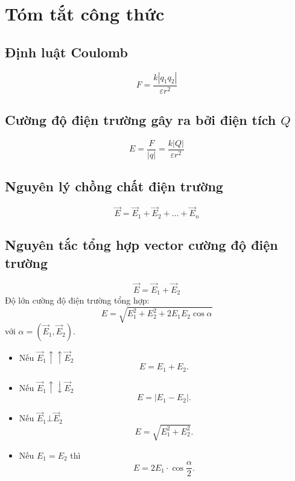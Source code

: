 \chapter{Tóm tắt công thức}
\begin{minipage}[l]{0.45\textwidth}
	\section{Định luật Coulomb}
	$$F=\dfrac{k\left|q_1q_2\right|}{\varepsilon r^2}$$
	\section{Cường độ điện trường gây ra bởi điện tích $Q$}
	$$E=\dfrac{F}{\left|q\right|}=\dfrac{k\left|Q\right|}{\varepsilon r^2}$$
	\section{Nguyên lý chồng chất điện trường}
	$$\vec E=\vec{E}_1+\vec{E}_2+\dots+\vec{E}_n$$
	\section{Nguyên tắc tổng hợp vector cường độ điện trường}
	$$\vec E=\vec{E}_1+\vec{E}_2$$
	Độ lớn cường độ điện trường tổng hợp:
	$$E=\sqrt{E^2_1+E^2_2+2E_1E_2\cos\alpha}$$
	với $\alpha=\left(\vec{E}_1, \vec{E}_2\right)$.
	\begin{itemize}
		\item Nếu $\vec{E}_1\uparrow\uparrow\vec{E}_2$
		$$E=E_1+E_2.$$
		\item Nếu $\vec{E}_1\uparrow\downarrow\vec{E}_2$
		$$E=\left|E_1-E_2\right|.$$
		\item Nếu $\vec{E}_1\bot\vec{E}_2$
		$$E=\sqrt{E^2_1+E^2_2}.$$
		\item Nếu $E_1=E_2$ thì
		$$E=2E_1\cdot\cos\dfrac{\alpha}{2}.$$
	\end{itemize}
\end{minipage}
\begin{minipage}[c]{0.1\textwidth}
\
\end{minipage}
